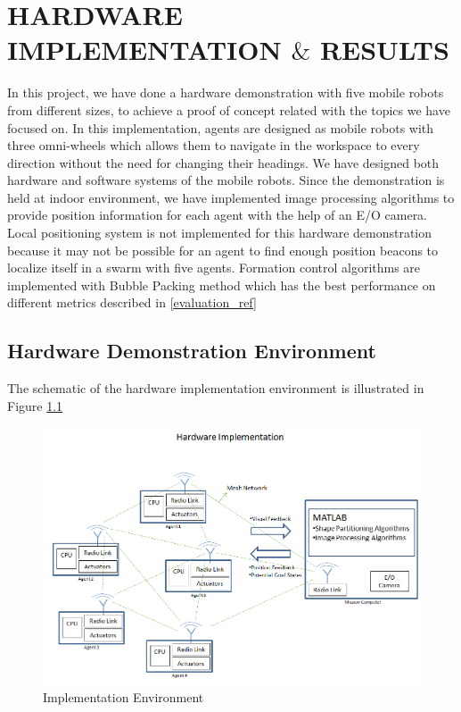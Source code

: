 

\chapter{HARDWARE IMPLEMENTATION $\&$ RESULTS}
\label{chp:hardware}









In this project, we have done a hardware demonstration with five mobile robots from different sizes, to achieve a proof of concept related with the topics we have focused on. In this implementation, agents are designed as mobile robots with three omni-wheels which allows them to navigate in the workspace to every direction without the need for changing their headings. We have designed both hardware and software systems of the mobile robots. Since the demonstration is held at indoor environment, we have implemented image processing algorithms to provide  position information for each agent with the help of an E/O camera. Local positioning system is not implemented for this hardware demonstration because it may not be possible for an agent to find enough position beacons to localize itself in a swarm with five agents. Formation control algorithms are implemented with Bubble Packing method which has the best performance on different metrics described in \ref{evaluation_ref}

\section{Hardware Demonstration Environment}
The schematic of the hardware implementation environment is illustrated in Figure \ref{harware_ref}
   
\begin{figure}[H]
\caption{Implementation Environment} \label{harware_ref}
\centerline{\includegraphics[scale = 0.55]{hardware}}
\end{figure} 
   
